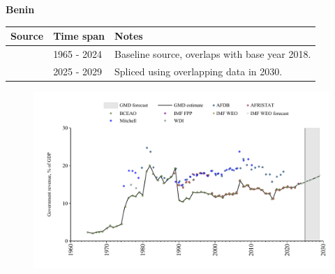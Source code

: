 \documentclass[12pt,a4paper,landscape]{article}
\begin{document}
\begin{adjustbox}{max totalsize={\paperwidth}{\paperheight},center}
\begin{minipage}[t][\textheight][t]{\textwidth}
\vspace*{0.5cm}
{}
\begin{center}
{\Large\bfseries Benin}
\end{center}
\vspace{0.5cm}
\begin{table}[H]
\centering
\small
\begin{tabular}{|l|l|l|}
\hline
\textbf{Source} & \textbf{Time span} & \textbf{Notes} \\
\hline
\rowcolor{white}\cite{BCEAO}& 1965 - 2024 &Baseline source, overlaps with base year 2018.\\
\rowcolor{lightgray}\cite{IMF_WEO_forecast}& 2025 - 2029 &Spliced using overlapping data in 2030.\\
\hline
\end{tabular}
\end{table}
\begin{figure}[H]
\centering
\includegraphics[width=\textwidth,height=0.6\textheight,keepaspectratio]{graphs/BEN_govrev_GDP.pdf}
\end{figure}
\end{minipage}
\end{adjustbox}
\end{document}
